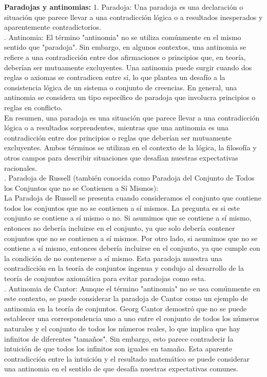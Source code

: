 \noindent \textbf{Paradojas y antinomias:} 1. Paradoja: Una paradoja es una declaración o situación que parece llevar a una contradicción lógica o a resultados inesperados y aparentemente contradictorios. \\

. Antinomia: El término "antinomia" no se utiliza comúnmente en el mismo sentido que "paradoja". Sin embargo, en algunos contextos, una antinomia se refiere a una contradicción entre dos afirmaciones o principios que, en teoría, deberían ser mutuamente excluyentes. Una antinomia puede surgir cuando dos reglas o axiomas se contradicen entre sí, lo que plantea un desafío a la consistencia lógica de un sistema o conjunto de creencias. En general, una antinomia se considera un tipo específico de paradoja que involucra principios o reglas en conflicto. \\

\noindent En resumen, una paradoja es una situación que parece llevar a una contradicción lógica o a resultados sorprendentes, mientras que una antinomia es una contradicción entre dos principios o reglas que deberían ser mutuamente excluyentes. Ambos términos se utilizan en el contexto de la lógica, la filosofía y otros campos para describir situaciones que desafían nuestras expectativas racionales. \\

. Paradoja de Russell (también conocida como Paradoja del Conjunto de Todos los Conjuntos que no se Contienen a Sí Mismos): \\

\noindent La Paradoja de Russell se presenta cuando consideramos el conjunto que contiene todos los conjuntos que no se contienen a sí mismos. La pregunta es si este conjunto se contiene a sí mismo o no. Si asumimos que se contiene a sí mismo, entonces no debería incluirse en el conjunto, ya que solo debería contener conjuntos que no se contienen a sí mismos. Por otro lado, si asumimos que no se contiene a sí mismo, entonces debería incluirse en el conjunto, ya que cumple con la condición de no contenerse a sí mismo. Esta paradoja muestra una contradicción en la teoría de conjuntos ingenua y condujo al desarrollo de la teoría de conjuntos axiomática para evitar paradojas como esta. \\

. Antinomia de Cantor: Aunque el término "antinomia" no se usa comúnmente en este contexto, se puede considerar la paradoja de Cantor como un ejemplo de antinomia en la teoría de conjuntos. Georg Cantor demostró que no se puede establecer una correspondencia uno a uno entre el conjunto de todos los números naturales y el conjunto de todos los números reales, lo que implica que hay infinitos de diferentes "tamaños". Sin embargo, esto parece contradecir la intuición de que todos los infinitos son iguales en tamaño. Esta aparente contradicción entre la intuición y el resultado matemático se puede considerar una antinomia en el sentido de que desafía nuestras expectativas comunes. \\

